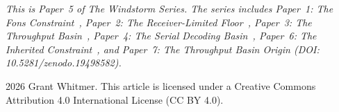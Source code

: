 \documentclass[11pt]{article}
\begin{document}
\bigskip
\noindent\emph{This is Paper~5 of The Windstorm Series. The series includes Paper~1: The Fons Constraint~\cite{whitmer2026fons}, Paper~2: The Receiver-Limited Floor~\cite{whitmer2026floor}, Paper~3: The Throughput Basin~\cite{whitmer2026basin}, Paper~4: The Serial Decoding Basin~\cite{whitmer2026serial}, Paper~6: The Inherited Constraint~\cite{whitmer2026inherited}, and Paper~7: The Throughput Basin Origin (DOI: 10.5281/zenodo.19498582).}

\bigskip
\noindent\textcopyright{} 2026 Grant Whitmer. This article is licensed under a Creative Commons Attribution 4.0 International License (CC BY 4.0).
\end{document}
